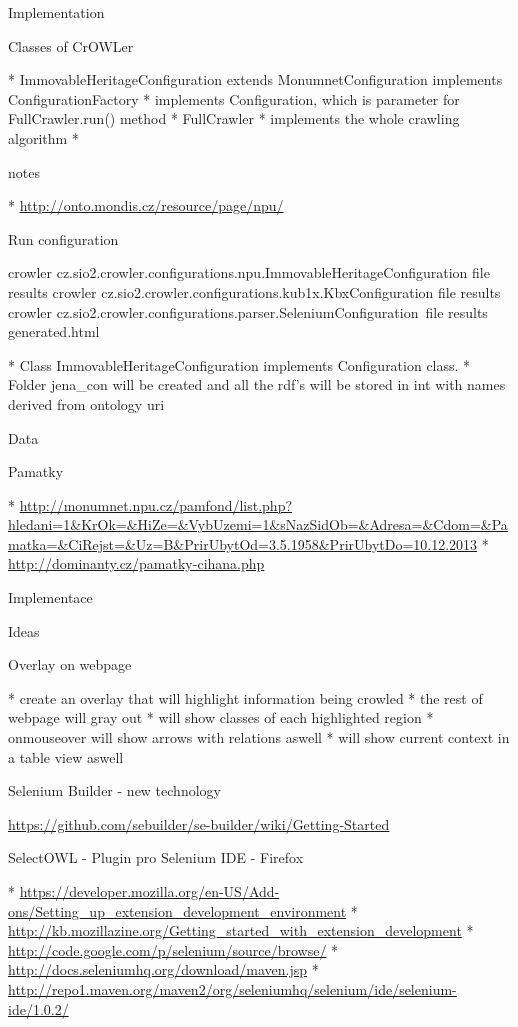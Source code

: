 \sec Implementation


\secc Classes of CrOWLer

\begitems
  * ImmovableHeritageConfiguration extends MonumnetConfiguration implements ConfigurationFactory 
  \begitems
    * implements Configuration, which is parameter for FullCrawler.run() method
  \enditems
  * FullCrawler
  \begitems
    * implements the whole crawling algorithm
    * 
  \enditems
\enditems


\sec notes

\begitems
  * \url{http://onto.mondis.cz/resource/page/npu/}
\enditems


\secc Run configuration 

\begtt
crowler cz.sio2.crowler.configurations.npu.ImmovableHeritageConfiguration file results
crowler cz.sio2.crowler.configurations.kub1x.KbxConfiguration file results
crowler cz.sio2.crowler.configurations.parser.SeleniumConfiguration\
         file results generated.html
\endtt

\begitems
  * Class ImmovableHeritageConfiguration implements Configuration class. 
  * Folder jena\_con will be created and all the rdf's will be stored in int with names derived from ontology uri
\enditems



\chap Data


\sec Pamatky

\begitems
  * \url{http://monumnet.npu.cz/pamfond/list.php?hledani=1&KrOk=&HiZe=&VybUzemi=1&sNazSidOb=&Adresa=&Cdom=&Pamatka=&CiRejst=&Uz=B&PrirUbytOd=3.5.1958&PrirUbytDo=10.12.2013}
  * \url{http://dominanty.cz/pamatky-cihana.php}
\enditems



\chap Implementace


\sec Ideas


\secc Overlay on webpage

\begitems
  * create an overlay that will highlight information being crowled
  * the rest of webpage will gray out
  * will show classes of each highlighted region
  * onmouseover will show arrows with relations aswell
  * will show current context in a table view aswell
\enditems


\secc Selenium Builder - new technology

\url{https://github.com/sebuilder/se-builder/wiki/Getting-Started}


\sec SelectOWL - Plugin pro Selenium IDE - Firefox

\begitems
  * \url{https://developer.mozilla.org/en-US/Add-ons/Setting_up_extension_development_environment}
  * \url{http://kb.mozillazine.org/Getting_started_with_extension_development}
  * \url{http://code.google.com/p/selenium/source/browse/}
  * \url{http://docs.seleniumhq.org/download/maven.jsp}
  * \url{http://repo1.maven.org/maven2/org/seleniumhq/selenium/ide/selenium-ide/1.0.2/}
\enditems



